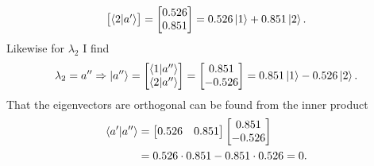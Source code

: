 \begin{example}
\begin{enumerate}
\begin{equation}
\begin{bmatrix}
				\braket{2|a'}\\
			\end{bmatrix}=\begin{bmatrix}
				0.526\\
				0.851\\
			\end{bmatrix}=0.526\ket{1}+0.851\ket{2}.
		\end{equation} 
		Likewise for $\lambda_2$ I find
		\begin{equation}
			\lambda_2=a''\Rightarrow
			\ket{a''}=\begin{bmatrix}
				\braket{1|a''}\\
				\braket{2|a''}\\
			\end{bmatrix}=\begin{bmatrix}
				0.851\\
				-0.526\\
			\end{bmatrix}=0.851\ket{1}-0.526\ket{2}.
		\end{equation} 	
		That the eigenvectors are orthogonal can be found from the inner product
		\begin{equation}
			\begin{split}
				\braket{a'|a''}&=\begin{bmatrix}
					0.526 & 0.851\\
				\end{bmatrix}\begin{bmatrix}
					0.851\\
					-0.526\\
				\end{bmatrix}\\
				&=0.526\cdot0.851-0.851\cdot0.526=0.
			\end{split}
		\end{equation} 	
	\end{enumerate}
\end{example}
